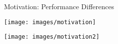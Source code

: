 \begin{frame}[c,allowframebreaks]{Motivation: Performance Differences  }
\begin{center}
\texttt{[image: images/motivation]}
\end{center}


\framebreak

\begin{center}
\texttt{[image: images/motivation2]}
\end{center}
\end{frame}


